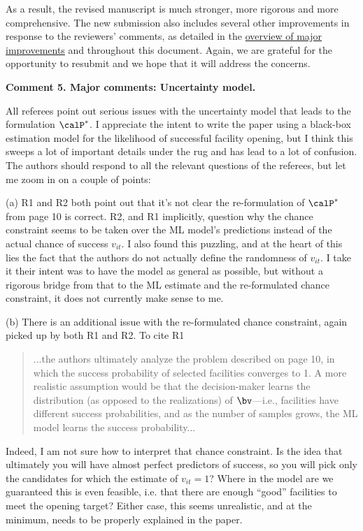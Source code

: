\documentclass[11pt]{article}
\begin{document}
As a result, the revised manuscript is much stronger, more rigorous and more comprehensive. The new submission also includes several other improvements in response to the reviewers' comments, as detailed in the \hyperref[sec:overview]{\color{blue}overview of major improvements} and throughout this document. Again, we are grateful for the opportunity to resubmit and we hope that it will address the concerns.

\begin{commentBox}
\textbf{Comment 5. Major comments: Uncertainty model.}\label{AE:5}

All referees point out serious issues with the uncertainty model that leads to the formulation $\calP^*$. I appreciate the intent to write the paper using a black-box estimation model for the likelihood of successful facility opening, but I think this sweeps a lot of important details under the rug and has lead to a lot of confusion. The authors should respond to all the relevant questions of the referees, but let me zoom in on a couple of points:

(a) R1 and R2 both point out that it’s not clear the re-formulation of $\calP^*$ from page 10 is correct. R2, and R1 implicitly, question why the chance constraint seems to be taken over the ML model’s predictions instead of the actual chance of success $v_{it}$. I also found this puzzling, and at the heart of this lies the fact that the authors do not actually define the randomness of $v_{it}$. I take it their intent was to have the model as general as possible, but without a rigorous bridge from that to the ML estimate and the re-formulated chance constraint, it does not currently make sense to me.

(b) There is an additional issue with the re-formulated chance constraint, again picked up by both R1 and R2. To cite R1
\begin{quote}
    ...the authors ultimately analyze the problem described on page 10, in which the success probability of selected facilities converges to 1. A more realistic assumption would be that the decision-maker learns the distribution (as opposed to the realizations) of $\bv$—i.e., facilities have different success probabilities, and as the number of samples grows, the ML model learns the success probability...
\end{quote}
Indeed, I am not sure how to interpret that chance constraint. Is the idea that ultimately you will have almost perfect predictors of success, so you will pick only the candidates for which the estimate of $v_{it} = 1$? Where in the model are we guaranteed this is even feasible, i.e. that there are enough ``good'' facilities to meet the opening target? Either case, this seems unrealistic, and at the minimum, needs to be properly explained in the paper.


\end{commentBox}
\end{document}

